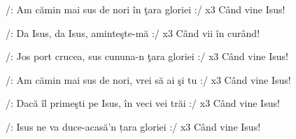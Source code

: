 
\beginverse
/: Am cămin mai sus de nori în ţara gloriei :/ x3
Când vine Isus!
\endverse

\beginchorus
/: Da Isus, da Isus, aminteşte-mă :/ x3
Când vii în curând!
\endchorus

\beginverse
/: Jos port crucea, sus cununa-n ţara gloriei :/ x3
Când vine Isus!
\endverse

\beginverse
/: Am cămin mai sus de nori, vrei să ai şi tu :/ x3
Când vine Isus!
\endverse

\beginverse
/: Dacă îl primeşti pe Isus, în veci vei trăi :/ x3
Când vine Isus!
\endverse

\beginverse
/: Isus ne va duce-acasă'n țara gloriei :/ x3
Când vine Isus!
\endverse

\endsong